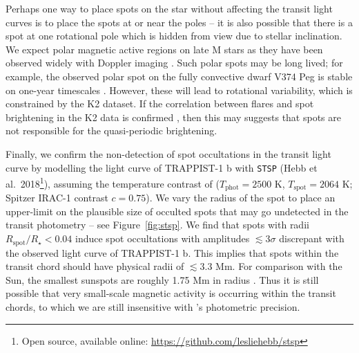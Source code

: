 Perhaps one way to place spots on the star without affecting the transit light curves is to place the spots at or near the poles -- it is also possible that there is a spot at one rotational pole which is hidden from view due to stellar inclination. We expect polar magnetic active regions on late M stars as they have been observed widely with Doppler imaging \citep[see e.g.][]{Strassmeier2002, Morin2008, Morin2010}. Such polar spots may be long lived; for example, the observed polar spot on the fully convective dwarf V374 Peg is stable on one-year timescales \citep{Morin2008}.  However, these will lead to rotational variability, which is constrained by the K2 dataset.  If the correlation between flares and spot brightening in the K2 data is confirmed \citep{Morris2018c}, then this may suggests that spots are not responsible for the quasi-periodic brightening.


Finally, we confirm the non-detection of spot occultations in the transit light curve by modelling the light curve of TRAPPIST-1 b with \texttt{STSP} (Hebb et al.~2018\footnote{Open source, available online: \url{https://github.com/lesliehebb/stsp}}), assuming the temperature contrast of \citet{Rackham2018} ($T_\mathrm{phot} = 2500$ K, $T_\mathrm{spot} = 2064$ K; Spitzer IRAC-1 contrast $c=0.75$). We vary the radius of the spot to place an upper-limit on the plausible size of occulted spots that may go undetected in the transit photometry -- see Figure~\ref{fig:stsp}. We find that spots with radii $R_\mathrm{spot}/R_\star < 0.04$ induce spot occultations with amplitudes $\lesssim 3\sigma$ discrepant with the observed \spitzer light curve of TRAPPIST-1 b. This implies that spots within the transit chord should have physical radii of $\lesssim 3.3$ Mm. For comparison with the Sun, the smallest sunspots are roughly 1.75 Mm in radius \citep{Solanki2003}. Thus it is still possible that very small-scale magnetic activity is occurring within the transit chords, to which we are still insensitive with \spitzer's  photometric precision.




